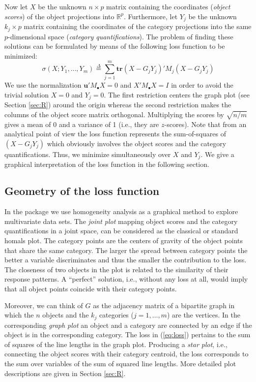 \documentclass[article, nojss]{jss}
\newcommand{\defi}{\mathop{=}\limits^{\Delta}}
\begin{document}
Now let $X$ be the unknown $n\times p$ matrix containing the coordinates (\emph{object scores}) of the object projections into $\mathbb{R}^p$. Furthermore, let $Y_j$ be the unknown $k_j \times p$ matrix containing the coordinates of the category projections into the same $p$-dimensional space (\emph{category quantifications}). 
The problem of finding these solutions can be formulated by means of the following loss function to be minimized:
\begin{equation}
\label{eq:loss}
\sigma(X;Y_1,\ldots,Y_m)\defi \sum_{j=1}^m\mathbf{tr}(X-G_jY_j)'M_j(X-G_jY_j)
\end{equation}
We use the normalization $\mathbf{u}'M_\bullet X=0$ and $X'M_\bullet X=I$ in order to avoid the trivial solution $X=0$ and $Y_j=0$. The first restriction centers the graph plot (see Section \ref{sec:R}) around the origin whereas the second restriction makes the columns of the object score matrix orthogonal. Multiplying the scores by $\sqrt{n/m}$ gives a mean of 0 and a variance of 1 (i.e., they are $z$-scores). Note that from an analytical point of view the loss function represents the sum-of-squares of $(X-G_jY_j)$ which obviously involves the object scores and the category quantifications. Thus, we minimize simultaneously over $X$ and $Y_j$. We give a graphical interpretation of the loss function in the following section. 

\subsection{Geometry of the loss function}
In the  package we use homogeneity analysis as a graphical method to explore multivariate data sets. The \emph{joint plot} mapping object scores and the category quantifications in a joint space, can be considered as the classical or standard homals plot. The category points are the centers of gravity of the object points that share the same category. The larger the spread between category points the better a variable discriminates and thus the smaller the contribution to the loss. The closeness of two objects in the plot is related to the similarity of their response patterns. A ``perfect'' solution, i.e., without any loss at all, would imply that all object points coincide with their category points. 

Moreover, we can think of $G$ as the adjacency matrix of a bipartite graph in which the $n$ objects and the $k_j$ categories ($j=1,\ldots,m$) are the vertices. In the corresponding \emph{graph plot} an object and a category are connected by an edge if the object is in the corresponding category. The loss in (\ref{eq:loss}) pertains to the sum of squares of the line lengths in the graph plot. Producing a \emph{star plot}, i.e., connecting the object scores with their category centroid, the loss corresponds to the sum over variables of the sum of squared line lengths. More detailed plot descriptions are given in Section \ref{sec:R}.
\end{document}
